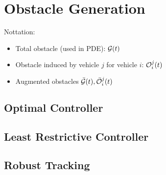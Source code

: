 \section{Obstacle Generation \label{sec:HJIVI}}
Nottation:
\begin{itemize}
\item Total obstacle (used in PDE): $\mathcal{G}(t)$
\item Obstacle induced by vehicle $j$ for vehicle $i$: $\mathcal{O}_i^j(t)$
\item Augmented obstacles $\bar{\mathcal{G}}(t), \bar{\mathcal{O}}_i^j(t)$
\end{itemize}

\subsection{Optimal Controller}
\subsection{Least Restrictive Controller}
\subsection{Robust Tracking}